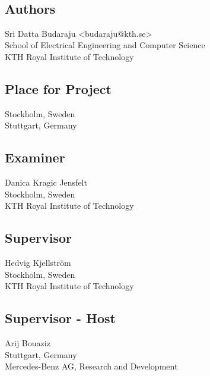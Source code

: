 \newpage
\thispagestyle{plain}
~\\
\vfill
{ 
	\subsection*{Authors}
	Sri Datta Budaraju <budaraju@kth.se>\\
    School of Electrical Engineering and Computer Science\\
	KTH Royal Institute of Technology
	
	\subsection*{Place for Project}
	Stockholm, Sweden\\
	Stuttgart, Germany

	\subsection*{Examiner}
	Danica Kragic Jensfelt\\
	Stockholm, Sweden\\
	KTH Royal Institute of Technology
	
	\subsection*{Supervisor }
	Hedvig Kjellström\\
	Stockholm, Sweden\\
	KTH Royal Institute of Technology
	
	\subsection*{Supervisor - Host}
	Arij Bouaziz\\
	Stuttgart, Germany\\
	Mercedes-Benz AG,  Research and Development
	~
}



